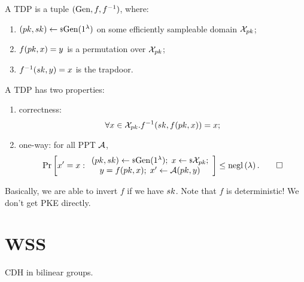 \begin{definition}
	A \ac{TDP} is a tuple $(\mathrm{Gen}, f, f^{-1})$, where:
	\begin{enumerate}
		\item $(pk, sk) \leftarrow {\scriptstyle \$} {\mathrm{Gen}(1^{\lambda})}$ on some efficiently sampleable domain $\mathcal{X}_{pk}$;
		\item $f(pk, x) = y$ is a permutation over $\mathcal{X}_{pk}$;
		\item $f^{-1}(sk, y) = x$ is the trapdoor.
	\end{enumerate}
	A \ac{TDP} has two properties:
	\begin{enumerate}
		\item correctness:
			\begin{equation*}
				\forall x \in \mathcal{X}_{pk} . f^{-1}(sk, f(pk, x)) = x;
			\end{equation*}
		\item one-way: for all \ac{PPT} $\mathcal{A}$,
			\begin{equation*}
				\mathop{\mathrm{Pr}}\limits_{} \left[ {
					x' = x :
					\begin{array}{c}
					(pk, sk) \leftarrow {\scriptstyle \$} {\mathrm{Gen}(1^{\lambda})}; \;
					x \leftarrow {\scriptstyle \$} {\mathcal{X}_{pk}}; \\
					y = f(pk, x); \;
					x' \leftarrow \mathcal{A}(pk, y)
					\end{array}
				} \right]
				\le \mathrm{negl}\left({\lambda}\right).
				\qedhere
			\end{equation*}
	\end{enumerate}
\end{definition}
Basically, we are able to invert $f$ if we have $sk$.
Note that $f$ is deterministic!
We don't get \ac{PKE} directly.
























\section{\acl{WSS}}

\ac{CDH} in bilinear groups.

